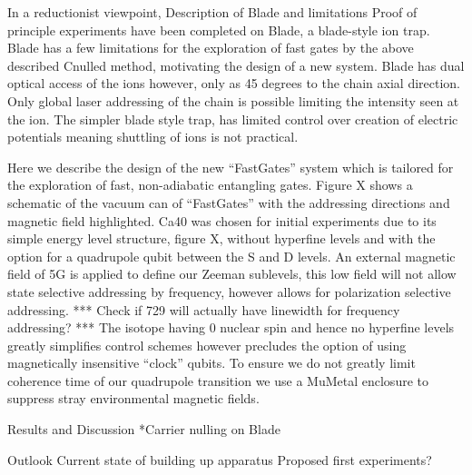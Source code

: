 In a reductionist viewpoint, 
Description of Blade and limitations Proof of principle experiments
have been completed on Blade, a blade-style ion trap. Blade has a few
limitations for the exploration of fast gates by the above described
Cnulled method, motivating the design of a new system.  Blade has dual
optical access of the ions however, only as 45 degrees to the chain
axial direction. Only global laser addressing of the chain is possible
limiting the intensity seen at the ion. The simpler blade style trap,
has limited control over creation of electric potentials meaning
shuttling of ions is not practical.


\subtitle{FastGates Apparatus}

Here we describe the design of the new ``FastGates'' system which is
tailored for the exploration of fast, non-adiabatic entangling
gates. Figure X shows a schematic of the vacuum can of ``FastGates''
with the addressing directions and magnetic field highlighted. Ca40
was chosen for initial experiments due to its simple energy level
structure, figure X, without hyperfine levels and with the option for
a quadrupole qubit between the S and D levels. An external magnetic
field of 5G is applied to define our Zeeman sublevels, this low field
will not allow state selective addressing by frequency, however allows
for polarization selective addressing. *** Check if 729 will actually
have linewidth for frequency addressing? *** The isotope having 0
nuclear spin and hence no hyperfine levels greatly simplifies control
schemes however precludes the option of using magnetically insensitive
``clock'' qubits. To ensure we do not greatly limit coherence time of
our quadrupole transition we use a MuMetal enclosure to suppress stray
environmental magnetic fields.



Results and Discussion
    *Carrier nulling on Blade

Outlook
    Current state of building up apparatus
    Proposed first experiments?

  

